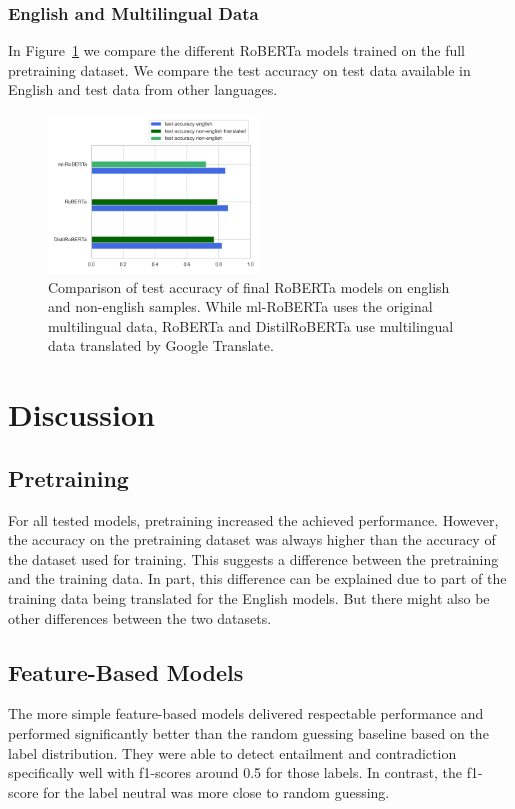 \documentclass[acmsmall,nonacm]{acmart}
\begin{document}
\subsubsection{English and Multilingual Data}
In Figure~\ref{fig:test_accuracy_english_vs_non_english} we compare the different RoBERTa models trained on the full pretraining dataset. We compare the test accuracy on test data available in English and test data from other languages. 

\begin{figure}[!h]
  \includegraphics[width=0.5\textwidth]{assets/test_accuracy_english_vs_non_english.png}
  \caption{Comparison of test accuracy of final RoBERTa models on english and non-english samples. While ml-RoBERTa uses the original multilingual data, RoBERTa and DistilRoBERTa use multilingual data translated by Google Translate.}
  \label{fig:test_accuracy_english_vs_non_english}
\end{figure}




\section{Discussion} 
\subsection{Pretraining}
For all tested models, pretraining increased the achieved performance. However, the accuracy on the pretraining dataset was always higher than the accuracy of the dataset used for training. This suggests a difference between the pretraining and the training data. In part, this difference can be explained due to part of the training data being translated for the English models. But there might also be other differences between the two datasets.

\subsection{Feature-Based Models}
The more simple feature-based models delivered respectable performance and performed significantly better than the random guessing baseline based on the label distribution. They were able to detect entailment and contradiction specifically well with f1-scores around 0.5 for those labels. In contrast, the f1-score for the label neutral was more close to random guessing. 
\end{document}
